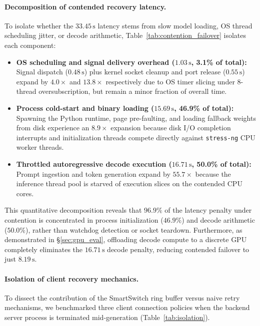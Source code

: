 \documentclass[11pt,a4paper]{article}
\newcommand{\su}{\,\mathrm{s}}
\newcommand{\code}[1]{\texttt{#1}}
\begin{document}
\paragraph{Decomposition of contended recovery latency.}
To isolate whether the $33.45\su$ latency stems from slow model loading, OS thread scheduling jitter, or decode arithmetic, Table~\ref{tab:contention_failover} isolates each component:
\begin{itemize}[leftmargin=*]
  \item \textbf{OS scheduling and signal delivery overhead ($1.03\su$, 3.1\% of total):} Signal dispatch ($0.48\su$) plus kernel socket cleanup and port release ($0.55\su$) expand by $4.0\times$ and $13.8\times$ respectively due to OS timer slicing under 8-thread oversubscription, but remain a minor fraction of overall time.
  \item \textbf{Process cold-start and binary loading ($15.69\su$, 46.9\% of total):} Spawning the Python runtime, page pre-faulting, and loading fallback weights from disk experience an $8.9\times$ expansion because disk I/O completion interrupts and initialization threads compete directly against \code{stress-ng} CPU worker threads.
  \item \textbf{Throttled autoregressive decode execution ($16.71\su$, 50.0\% of total):} Prompt ingestion and token generation expand by $55.7\times$ because the inference thread pool is starved of execution slices on the contended CPU cores.
\end{itemize}
This quantitative decomposition reveals that $96.9\%$ of the latency penalty under contention is concentrated in process initialization ($46.9\%$) and decode arithmetic ($50.0\%$), rather than watchdog detection or socket teardown. Furthermore, as demonstrated in \S\ref{sec:gpu_eval}, offloading decode compute to a discrete GPU completely eliminates the $16.71\su$ decode penalty, reducing contended failover to just $8.19\su$.

\paragraph{Isolation of client recovery mechanics.}
To dissect the contribution of the SmartSwitch ring buffer versus naive retry mechanisms, we benchmarked three client connection policies when the backend server process is terminated mid-generation (Table~\ref{tab:isolation}).
\end{document}
